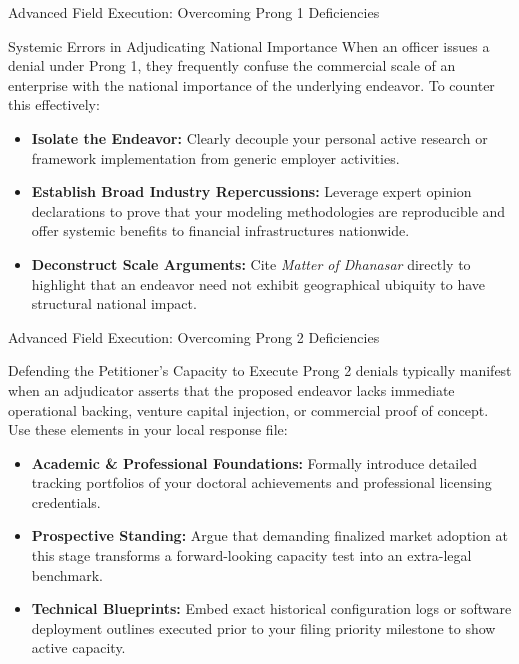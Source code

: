 \documentclass[11pt]{beamer}
\begin{document}
	
	\begin{frame}{Advanced Field Execution: Overcoming Prong 1 Deficiencies}
		\scriptsize
		\begin{block}{Systemic Errors in Adjudicating National Importance}
			When an officer issues a denial under Prong 1, they frequently confuse the commercial scale of an enterprise with the national importance of the underlying endeavor. To counter this effectively:
			\begin{itemize}
				\item \textbf{Isolate the Endeavor:} Clearly decouple your personal active research or framework implementation from generic employer activities.
				\item \textbf{Establish Broad Industry Repercussions:} Leverage expert opinion declarations to prove that your modeling methodologies are reproducible and offer systemic benefits to financial infrastructures nationwide.
				\item \textbf{Deconstruct Scale Arguments:} Cite \textit{Matter of Dhanasar} directly to highlight that an endeavor need not exhibit geographical ubiquity to have structural national impact.
			\end{itemize}
		\end{block}
	\end{frame}
	
	\begin{frame}{Advanced Field Execution: Overcoming Prong 2 Deficiencies}
		\scriptsize
		\begin{block}{Defending the Petitioner's Capacity to Execute}
			Prong 2 denials typically manifest when an adjudicator asserts that the proposed endeavor lacks immediate operational backing, venture capital injection, or commercial proof of concept. Use these elements in your local response file:
			\begin{itemize}
				\item \textbf{Academic \& Professional Foundations:} Formally introduce detailed tracking portfolios of your doctoral achievements and professional licensing credentials.
				\item \textbf{Prospective Standing:} Argue that demanding finalized market adoption at this stage transforms a forward-looking capacity test into an extra-legal benchmark.
				\item \textbf{Technical Blueprints:} Embed exact historical configuration logs or software deployment outlines executed prior to your filing priority milestone to show active capacity.
			\end{itemize}
		\end{block}
	\end{frame}
	
\end{document}

